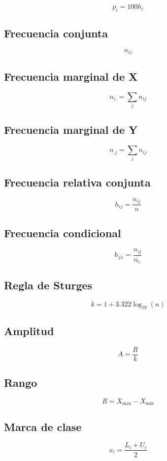 \documentclass[
  spanish,
  14pt,
  letterpaper,
  DIV=11,
  numbers=noendperiod]{scrartcl}
\begin{document}
\[
p_i=100h_i
\]

\subsection{Frecuencia conjunta}\label{frecuencia-conjunta-1}

\[
n_{ij}
\]

\subsection{Frecuencia marginal de X}\label{frecuencia-marginal-de-x-1}

\[
n_{i.}=\sum_jn_{ij}
\]

\subsection{Frecuencia marginal de Y}\label{frecuencia-marginal-de-y-1}

\[
n_{.j}=\sum_in_{ij}
\]

\subsection{Frecuencia relativa
conjunta}\label{frecuencia-relativa-conjunta}

\[
h_{ij}=\frac{n_{ij}}{n}
\]

\subsection{Frecuencia condicional}\label{frecuencia-condicional}

\[
h_{j|i}=\frac{n_{ij}}{n_{i.}}
\]

\subsection{Regla de Sturges}\label{regla-de-sturges}

\[
k=1+3.322\log_{10}(n)
\]

\subsection{Amplitud}\label{amplitud}

\[
A=\frac{R}{k}
\]

\subsection{Rango}\label{rango}

\[
R=X_{\max}-X_{\min}
\]

\subsection{Marca de clase}\label{marca-de-clase}

\[
x_i=\frac{L_i+U_i}{2}
\]
\end{document}
